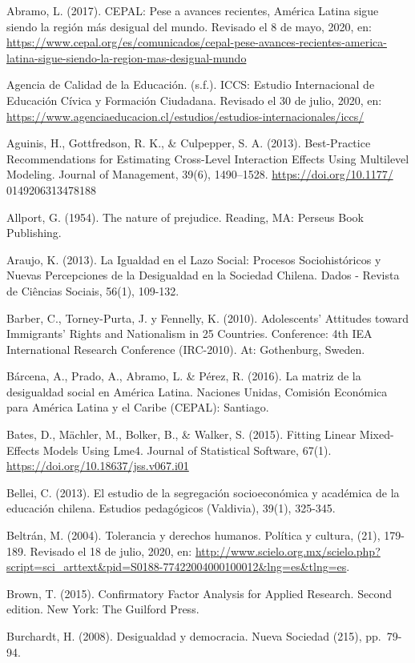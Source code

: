 \documentclass[12pt,twoside]{templates/facsothesis}
\begin{document}
Abramo, L. (2017). CEPAL: Pese a avances recientes, América Latina sigue siendo la región más desigual del mundo. Revisado el 8 de mayo, 2020, en: \url{https://www.cepal.org/es/comunicados/cepal-pese-avances-recientes-america-latina-sigue-siendo-la-region-mas-desigual-mundo}

Agencia de Calidad de la Educación. (s.f.). ICCS: Estudio Internacional de Educación Cívica y Formación Ciudadana. Revisado el 30 de julio, 2020, en: \url{https://www.agenciaeducacion.cl/estudios/estudios-internacionales/iccs/}

Aguinis, H., Gottfredson, R. K., \& Culpepper, S. A. (2013). Best-Practice Recommendations for Estimating Cross-Level Interaction Effects Using Multilevel Modeling. Journal of Management, 39(6), 1490--1528. \url{https://doi.org/10.1177/} 0149206313478188

Allport, G. (1954). The nature of prejudice. Reading, MA: Perseus Book Publishing.

Araujo, K. (2013). La Igualdad en el Lazo Social: Procesos Sociohistóricos y Nuevas Percepciones de la Desigualdad en la Sociedad Chilena. Dados - Revista de Ciências Sociais, 56(1), 109-132.

Barber, C., Torney-Purta, J. y Fennelly, K. (2010). Adolescents' Attitudes toward Immigrants' Rights and Nationalism in 25 Countries. Conference: 4th IEA International Research Conference (IRC-2010). At: Gothenburg, Sweden.

Bárcena, A., Prado, A., Abramo, L. \& Pérez, R. (2016). La matriz de la desigualdad social en América Latina. Naciones Unidas, Comisión Económica para América Latina y el Caribe (CEPAL): Santiago.

Bates, D., Mächler, M., Bolker, B., \& Walker, S. (2015). Fitting Linear Mixed-Effects Models Using Lme4. Journal of Statistical Software, 67(1). \url{https://doi.org/10.18637/jss.v067.i01}

Bellei, C. (2013). El estudio de la segregación socioeconómica y académica de la educación chilena. Estudios pedagógicos (Valdivia), 39(1), 325-345.

Beltrán, M. (2004). Tolerancia y derechos humanos. Política y cultura, (21), 179-189. Revisado el 18 de julio, 2020, en: \url{http://www.scielo.org.mx/scielo.php?script=sci_arttext\&pid=S0188-77422004000100012\&lng=es\&tlng=es}.

Brown, T. (2015). Confirmatory Factor Analysis for Applied Research. Second edition. New York: The Guilford Press.

Burchardt, H. (2008). Desigualdad y democracia. Nueva Sociedad (215), pp.~79-94.
\end{document}
